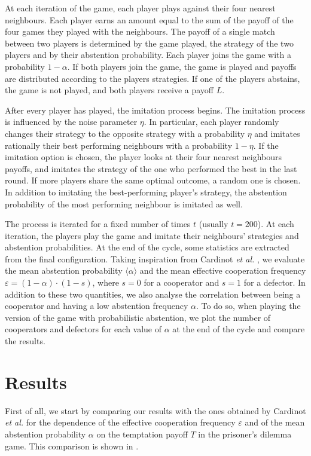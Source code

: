 \documentclass[12pt,oneside,a4paper,fleqn]{article}
\begin{document}
At each iteration of the game, each player plays against their four nearest neighbours.
Each player earns an amount equal to the sum of the payoff of the four games they played with the neighbours.
The payoff of a single match between two players is determined by the game played, the strategy of the two players and by their abstention probability.
Each player joins the game with a probability $1-\alpha$.
If both players join the game, the game is played and payoffs are distributed according to the players strategies.
If one of the players abstains, the game is not played, and both players receive a payoff $L$.

After every player has played, the imitation process begins.
The imitation process is influenced by the noise parameter $\eta$.
In particular, each player randomly changes their strategy to the opposite strategy with a probability $\eta$ and imitates rationally their best performing neighbours with a probability $1-\eta$.
If the imitation option is chosen, the player looks at their four nearest neighbours payoffs, and imitates the strategy of the one who performed the best in the last round.
If more players share the same optimal outcome, a random one is chosen.
In addition to imitating the best-performing player's strategy, the abstention probability of the most performing neighbour is imitated as well.

The process is iterated for a fixed number of times $t$ (usually $t=200$).
At each iteration, the players play the game and imitate their neighbours' strategies and abstention probabilities.
At the end of the cycle, some statistics are extracted from the final configuration.
Taking inspiration from Cardinot \emph{et al.} \cite{cardinot2018}, we evaluate the mean abstention probability $\langle \alpha \rangle$ and the mean effective cooperation frequency $\varepsilon = (1-\alpha)\cdot (1-s)$, where $s = 0$ for a cooperator and $s=1$ for a defector.
In addition to these two quantities, we also analyse the correlation between being a cooperator and having a low abstention frequency $\alpha$. 
To do so, when playing the version of the game with probabilistic abstention, we plot the number of cooperators and defectors for each value of $\alpha$ at the end of the cycle and compare the results.


\section{Results}
\label{sec:results}

First of all, we start by comparing our results with the ones obtained by Cardinot \emph{et al.} \cite{cardinot2018} for the dependence of the effective cooperation frequency $\varepsilon$ and of the mean abstention probability $\alpha$ on the temptation payoff $T$ in the prisoner's dilemma game.
This comparison is shown in .
\end{document}
